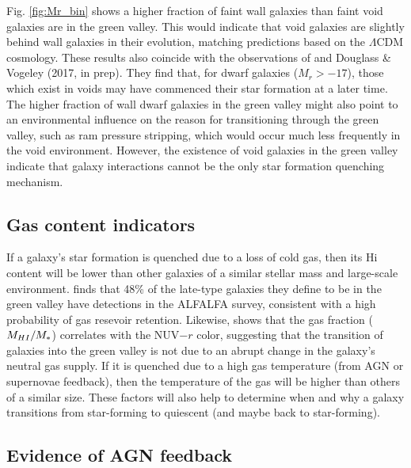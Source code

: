 Fig. \ref{fig:Mr_bin} shows a higher fraction of faint wall galaxies than faint 
void galaxies are in the green valley.  This would indicate that void galaxies 
are slightly behind wall galaxies in their evolution, matching predictions based 
on the $\Lambda$CDM cosmology.  These results also coincide with the 
observations of \cite{Douglass17b} and Douglass \& Vogeley (2017, in prep).  
They find that, for dwarf galaxies ($M_r > -17$), those which exist in voids may 
have commenced their star formation at a later time.  The higher fraction of 
wall dwarf galaxies in the green valley might also point to an environmental 
influence on the reason for transitioning through the green valley, such as ram 
pressure stripping, which would occur much less frequently in the void 
environment.  However, the existence of void galaxies in the green valley 
indicate that galaxy interactions cannot be the only star formation quenching 
mechanism.


\subsection{Gas content indicators}

If a galaxy's star formation is quenched due to a loss of cold gas, then its 
H{\sc i} content will be lower than other galaxies of a similar stellar mass and 
large-scale environment.  \cite{Schawinski14} finds that 48\% of the late-type 
galaxies they define to be in the green valley have  detections in the 
ALFALFA survey, consistent with a high probability of gas resevoir retention.  
Likewise, \cite{Catinella12} shows that the gas fraction ($M_{\ion{H}{1}}/M_*$) 
correlates with the NUV$-r$ color, suggesting that the transition of galaxies 
into the green valley is not due to an abrupt change in the galaxy's neutral gas 
supply.  If it is quenched due to a high gas temperature (from AGN or supernovae 
feedback), then the temperature of the gas will be higher than others of a 
similar size.  These factors will also help to determine when and why a galaxy 
transitions from star-forming to quiescent (and maybe back to star-forming).


\subsection{Evidence of AGN feedback}

